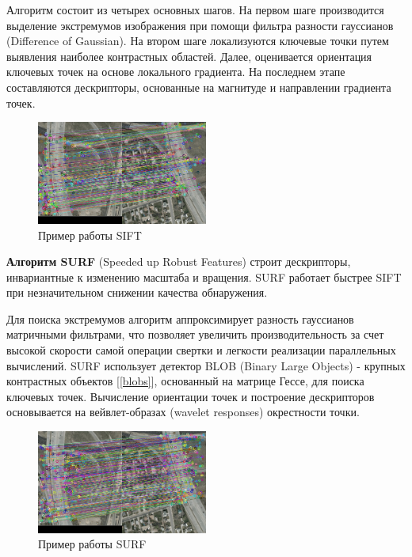 {{		Алгоритм состоит из четырех основных шагов. На первом шаге производится выделение экстремумов изображения при помощи фильтра разности гауссианов (Difference of Gaussian). На втором шаге локализуются ключевые точки путем выявления наиболее контрастных областей. Далее, оценивается ориентация ключевых точек на основе локального градиента. На последнем этапе составляются дескрипторы, основанные на магнитуде и направлении градиента точек.
		
		\begin{figure}[H]
			\centering                             
			\includegraphics[width=0.5\textwidth,keepaspectratio]{descriptors/sift.jpg}                 
			\centering\caption{ Пример работы SIFT }
			\label{descriptors sift}                           
		\end{figure}    
		
		{\bf Алгоритм SURF} (Speeded up Robust Features) строит дескрипторы, инвариантные к изменению масштаба и вращения. SURF работает быстрее SIFT при незначительном снижении качества обнаружения.
		
		Для поиска экстремумов алгоритм аппроксимирует разность гауссианов матричными фильтрами, что позволяет увеличить производительность за счет высокой скорости самой операции свертки и легкости реализации параллельных вычислений. SURF использует детектор BLOB (Binary Large Objects) - крупных контрастных объектов [\ref{blobs}], основанный на матрице Гессе, для поиска ключевых точек.  Вычисление ориентации точек и построение дескрипторов основывается на вейвлет-образах (wavelet responses) окрестности точки.
		
		\begin{figure}[H]
			\centering                             
			\includegraphics[width=0.5\textwidth,keepaspectratio]{descriptors/surf.jpg}                 
			\centering\caption{ Пример работы SURF }
			\label{descriptors surf}                           
		\end{figure}    
		
}}
